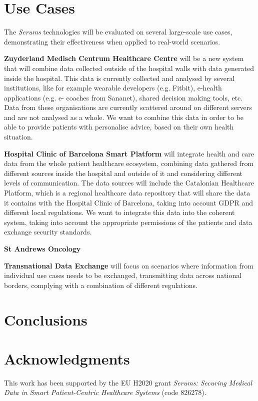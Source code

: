 \documentclass[sigconf]{acmart}
\begin{document}
\section{Use Cases}
The \emph{Serums} technologies will be evaluated on several large-scale use cases, demonstrating their effectiveness when applied to real-world scenarios.

\textbf{Zuyderland Medisch Centrum Healthcare Centre} will be a new system that will combine data collected outside of the hospital walls with data generated inside the hospital. This data is currently collected and analysed by several institutions, like for example wearable developers (e.g. Fitbit), e-health applications (e.g. e- coaches from Sananet), shared decision making tools, etc. Data from these organisations are currently scattered around on different servers and are not analysed as a whole. We want to combine this data in order to be able to provide patients with personalise advice, based on their own health situation.

\textbf{Hospital Clinic of Barcelona Smart Platform} will integrate health and care data from the whole patient healthcare ecosystem, combining data gathered from different sources inside the hospital and outside of it and considering different levels of communication. The data sources will include the Catalonian Healthcare Platform, which is a regional healthcare data repository that will share the data it contains with the Hospital Clinic of Barcelona, taking into account GDPR and different local regulations. We want to integrate this data into the coherent system, taking into account the appropriate permissions of the patients and data exchange security standards.

\textbf{St Andrews Oncology}

\textbf{Transnational Data Exchange} will focus on scenarios where information from individual use cases needs to be exchanged, transmitting data across national borders, complying with a combination of different regulations.

\section{Conclusions}

\section*{Acknowledgments}
This work has been supported by the EU H2020 grant \emph{Serums: Securing Medical Data in Smart Patient-Centric Healthcare Systems} (code 826278).
\end{document}
